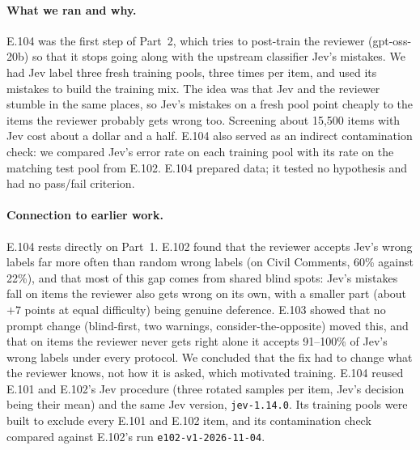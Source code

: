 \documentclass[11pt]{article}
\renewcommand{\_}{\origunderscore\allowbreak}
\begin{document}
\paragraph{What we ran and why.}
E.104 was the first step of Part~2, which tries to post-train the reviewer (gpt-oss-20b) so that it stops going along with the upstream classifier Jev's mistakes. We had Jev label three fresh training pools, three times per item, and used its mistakes to build the training mix. The idea was that Jev and the reviewer stumble in the same places, so Jev's mistakes on a fresh pool point cheaply to the items the reviewer probably gets wrong too. Screening about 15,500 items with Jev cost about a dollar and a half. E.104 also served as an indirect contamination check: we compared Jev's error rate on each training pool with its rate on the matching test pool from E.102. E.104 prepared data; it tested no hypothesis and had no pass/fail criterion.

\paragraph{Connection to earlier work.}
E.104 rests directly on Part~1. E.102 found that the reviewer accepts Jev's wrong labels far more often than random wrong labels (on Civil Comments, 60\% against 22\%), and that most of this gap comes from shared blind spots: Jev's mistakes fall on items the reviewer also gets wrong on its own, with a smaller part (about $+7$ points at equal difficulty) being genuine deference. E.103 showed that no prompt change (blind-first, two warnings, consider-the-opposite) moved this, and that on items the reviewer never gets right alone it accepts 91--100\% of Jev's wrong labels under every protocol. We concluded that the fix had to change what the reviewer knows, not how it is asked, which motivated training. E.104 reused E.101 and E.102's Jev procedure (three rotated samples per item, Jev's decision being their mean) and the same Jev version, \texttt{jev-1.14.0}. Its training pools were built to exclude every E.101 and E.102 item, and its contamination check compared against E.102's run \texttt{e102-v1-2026-11-04}.
\end{document}
